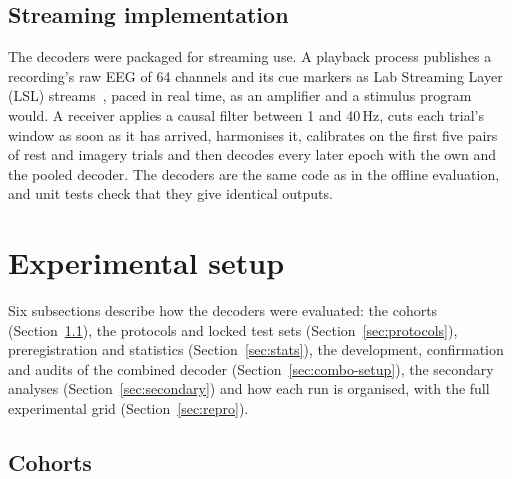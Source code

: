 \documentclass[pdflatex,sn-mathphys-num]{sn-jnl}
\begin{document}
\subsection{Streaming implementation}\label{sec:stream}

The decoders were packaged for streaming use. A playback process publishes a recording's raw EEG of 64 channels and its cue markers as Lab Streaming Layer (LSL) streams~\cite{kothe2025}, paced in real time, as an amplifier and a stimulus program would. A receiver applies a causal filter between 1 and 40\,Hz, cuts each trial's window as soon as it has arrived, harmonises it, calibrates on the first five pairs of rest and imagery trials and then decodes every later epoch with the own and the pooled decoder. The decoders are the same code as in the offline evaluation, and unit tests check that they give identical outputs.

\section{Experimental setup}\label{sec:setup}

Six subsections describe how the decoders were evaluated: the cohorts (Section~\ref{sec:cohorts}), the protocols and locked test sets (Section~\ref{sec:protocols}), preregistration and statistics (Section~\ref{sec:stats}), the development, confirmation and audits of the combined decoder (Section~\ref{sec:combo-setup}), the secondary analyses (Section~\ref{sec:secondary}) and how each run is organised, with the full experimental grid (Section~\ref{sec:repro}).

\subsection{Cohorts}\label{sec:cohorts}
\end{document}
